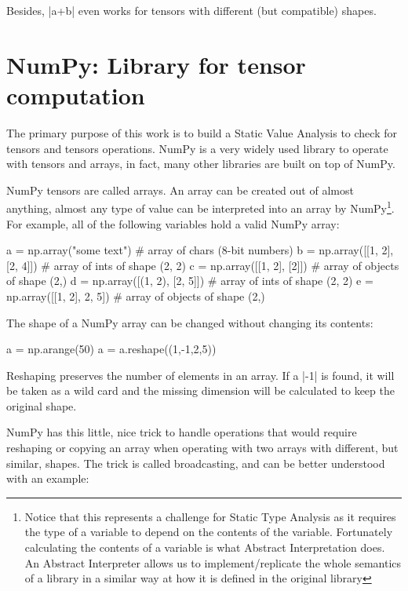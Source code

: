 Besides, \pycode|a+b| even works for tensors with different (but compatible) shapes.

\section{NumPy: Library for tensor computation}
\label{numpy-library-for-tensor-computation}

The primary purpose of this work is to build a Static Value Analysis to
check for tensors and tensors operations. NumPy
\autocite{oliphant2006guide} is a very widely used library to operate
with tensors and arrays, in fact, many other libraries are built on top
of NumPy.

NumPy tensors are called arrays. An array can be created out of almost
anything, almost any type of value can be interpreted into an array by
NumPy\footnote{Notice that this represents a challenge for Static Type
  Analysis as it requires the type of a variable to depend on the
  contents of the variable. Fortunately calculating the contents of a
  variable is what Abstract Interpretation does. An Abstract Interpreter
  allows us to implement/replicate the whole semantics of a library in a
  similar way at how it is defined in the original library}. For
example, all of the following variables hold a valid NumPy array:

\begin{pythoncode}
a = np.array("some text")       # array of chars (8-bit numbers)
b = np.array([[1, 2], [2, 4]])  # array of ints of shape (2, 2)
c = np.array([[1, 2], [2]])     # array of objects of shape (2,)
d = np.array([(1, 2), [2, 5]])  # array of ints of shape (2, 2)
e = np.array([[1, 2], {2, 5}])     # array of objects of shape (2,)
\end{pythoncode}

The shape of a NumPy array can be changed without changing its contents:

\begin{pythoncode}
a = np.arange(50)
a = a.reshape((1,-1,2,5))
\end{pythoncode}

Reshaping preserves the number of elements in an array. If a
\pycode|-1| is found, it will be taken as a wild card and the missing
dimension will be calculated to keep the original shape.

NumPy has this little, nice trick to handle operations that would
require reshaping or copying an array when operating with two arrays
with different, but similar, shapes. The trick is called broadcasting,
and can be better understood with an example:

